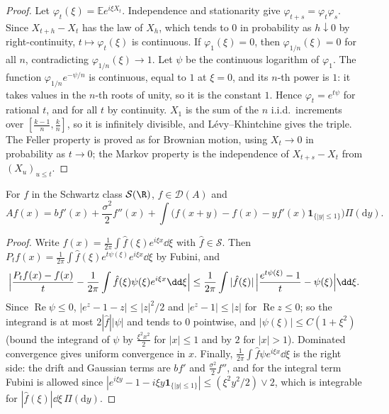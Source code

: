 \begin{proof}
Let $\varphi_t(\xi)=\mathbb Ee^{i\xi X_t}$. Independence and stationarity give $\varphi_{t+s}=\varphi_t\varphi_s$. Since $X_{t+h}-X_t$ has the law of $X_h$, which tends to $0$ in probability as $h\downarrow0$ by right-continuity,
$t\mapsto\varphi_t(\xi)$ is continuous. If $\varphi_1(\xi)=0$, then $\varphi_{1/n}(\xi)=0$ for all $n$, contradicting $\varphi_{1/n}(\xi)\to1$. Let $\psi$ be the continuous logarithm of $\varphi_1$. The function
$\varphi_{1/n}e^{-\psi/n}$ is continuous, equal to $1$ at $\xi=0$, and its $n$-th power is $1$: it takes values in the $n$-th roots of unity, so it is the constant $1$. Hence $\varphi_t=e^{t\psi}$ for rational $t$, and for all $t$ by
continuity. $X_1$ is the sum of the $n$ i.i.d.\ increments over $[\frac{k-1}n,\frac kn]$, so it is infinitely divisible, and L\'evy--Khintchine gives the triple. The Feller property is proved as for Brownian motion, using
$X_t\to0$ in probability as $t\to0$; the Markov property is the independence of $X_{t+s}-X_t$ from $(X_u)_{u\le t}$.
\end{proof}

\begin{proposition}\label{prop:levygen}
For $f$ in the Schwartz class $\mathcal S(\R)$, $f\in\mathcal D(A)$ and
\[
Af(x)=bf'(x)+\frac{\sigma^2}2f''(x)+\int\bigl(f(x+y)-f(x)-yf'(x)\mathbf 1_{\{|y|\le1\}}\bigr)\Pi(\mathrm dy).
\]
\end{proposition}

\begin{proof}
Write $f(x)=\frac1{2\pi}\int\hat f(\xi)e^{i\xi x}\dd\xi$ with $\hat f\in\mathcal S$. Then $P_tf(x)=\frac1{2\pi}\int\hat f(\xi)e^{t\psi(\xi)}e^{i\xi x}\dd\xi$ by Fubini, and
\[
\Bigl|\frac{P_tf(x)-f(x)}t-\frac1{2\pi}\int\hat f(\xi)\psi(\xi)e^{i\xi x}\dd\xi\Bigr|\le\frac1{2\pi}\int|\hat f(\xi)|\,\Bigl|\frac{e^{t\psi(\xi)}-1}t-\psi(\xi)\Bigr|\dd\xi .
\]
Since $\operatorname{Re}\psi\le0$, $|e^{z}-1-z|\le|z|^2/2$ and $|e^z-1|\le|z|$ for $\operatorname{Re}z\le0$; so the integrand is at most $2|\hat f||\psi|$ and tends to $0$ pointwise, and $|\psi(\xi)|\le C(1+\xi^2)$ (bound the integrand of
$\psi$ by $\frac{\xi^2x^2}2$ for $|x|\le1$ and by $2$ for $|x|>1$). Dominated convergence gives uniform convergence in $x$. Finally, $\frac1{2\pi}\int\hat f\psi e^{i\xi x}\dd\xi$ is the right side: the drift and Gaussian
terms are $bf'$ and $\frac{\sigma^2}2f''$, and for the integral term Fubini is allowed since $|e^{i\xi y}-1-i\xi y\mathbf 1_{\{|y|\le1\}}|\le(\xi^2y^2/2)\vee2$, which is integrable for $|\hat f(\xi)|\dd\xi\,\Pi(\mathrm dy)$.
\end{proof}

